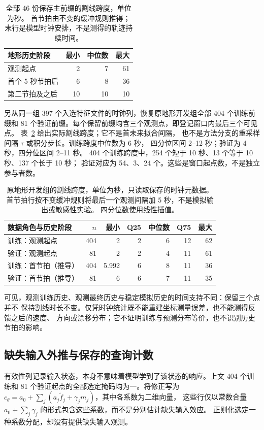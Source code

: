 \documentclass[UTF8,11pt]{ctexart}
\begin{document}
\begin{table}[htbp]
\centering\small
\caption{全部 46 份保存主前缀的割线跨度，单位为秒。
首节拍由不变的缓冲规则推得；末行是模型时钟安排，不是测得的轨迹持续时间。}
\label{tab:history-spans}
\begin{tabular}{lrrr}
\toprule
地形历史阶段 & 最小 & 中位数 & 最大\\
\midrule
观测起点 & 2 & 7 & 61\\
首个 5 秒节拍后 & 6 & 8 & 36\\
第二节拍及之后 & 10 & 10 & 10\\
\bottomrule
\end{tabular}
\end{table}

另从同一组 397 个入选特征文件的时钟列，恢复原地形开发组全部 404 个训练前缀和
81 个验证前缀。每个保留前缀均含三个观测点，即登记窗口内最后三个可见点。
表~\ref{tab:development-history-spans} 给出实际割线跨度；它不是首未来拟合间隔，
也不是方法分支的重采样间隔 \(\tau\) 或积分步长。训练跨度中位数为 6 秒，
四分位区间 2--12 秒；验证为 4 秒，四分位区间 2--11 秒。
404 个训练跨度中，254 个短于 10 秒、13 个等于 10 秒、137 个长于 10 秒；
验证对应为 54、3、24 个。这些是窗口起点数，不是独立参与者数。

\begin{table}[htbp]
\centering\small
\caption{原地形开发组的割线跨度，单位为秒，只读取保存的时钟元数据。
首节拍行按不变缓冲规则将最后一个观测间隔加 5 秒，不是模拟输出或敏感性实验。
四分位数使用线性插值。}
\label{tab:development-history-spans}
\begin{tabular}{lrrrrrr}
\toprule
数据角色与历史阶段 & \(n\) & 最小 & Q25 & 中位数 & Q75 & 最大\\
\midrule
训练：观测起点 & 404 & 2 & 2 & 6 & 12 & 62\\
验证：观测起点 & 81 & 2 & 2 & 4 & 11 & 61\\
训练：首节拍（推导） & 404 & 5.992 & 6 & 8 & 11 & 36\\
验证：首节拍（推导） & 81 & 6 & 6 & 7 & 11 & 35\\
\bottomrule
\end{tabular}
\end{table}

可见，观测训练历史、观测最终历史与稳定模拟历史的时间支持不同：保留三个点并不
保持割线时长不变。仅凭时钟统计既不能重建坐标测量误差，也不能测得反馈之后的速度、
方向或漂移分布；它不证明训练与预测分布等价，也不识别历史节拍的影响。

\subsection{缺失输入外推与保存的查询计数}
\label{sec:missing-input-scope}
有效性列记录输入状态，本身不意味着模型学到了该状态的响应。上文 404 个训练和
81 个验证起点的全部选定掩码均为一。将修正写为
\(c_\theta=a_0+\sum_j(a_j\widetilde f_j+\gamma_jm_j)\)，其中各系数为二维向量，
这些行仅以常数合量 \(a_0+\sum_j\gamma_j\) 的形式包含这些系数，而不是分别估计缺失输入效应。
正则化选定一种系数分配，却没有提供缺失输入观测。
\end{document}
